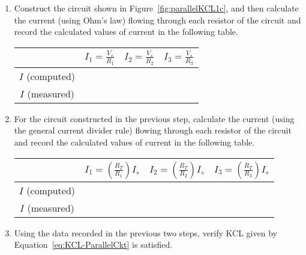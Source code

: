 \begin{enumerate}
   
 \item Construct the circuit shown in Figure~\ref{fig:parallelKCL1c}, and then calculate the current (using Ohm's law) flowing through each resistor of the circuit and record the calculated values of current in the following table. %

   \begin{center}
     \begin{tabular}{c|c|c|c}
       \toprule
       & $I_1=\frac{V_s}{R_1}$ & $I_2=\frac{V_s}{R_2}$ & $I_3=\frac{V_s}{R_3}$\\
       \toprule    
       $I$ (computed) & & & \\
       \hline
       $I$ (measured) & & & \\    
       \bottomrule
     \end{tabular}        
   \end{center}

  


 \item For the circuit constructed in the previous step, calculate the current (using the general current divider rule) flowing through each resistor of the circuit and record the calculated values of current in the following table.

   \begin{center}
     \begin{tabular}{c|c|c|c}
       \toprule
       & $I_1=\left(\frac{R_T}{R_1}\right)I_s$ & $I_2=\left(\frac{R_T}{R_2}\right)I_s$ & $I_3=\left(\frac{R_T}{R_3}\right)I_s$\\
       \toprule    
       $I$ (computed) & & & \\
       \hline
       $I$ (measured) & & & \\    
       \bottomrule
     \end{tabular}        
   \end{center}




  
\item Using the data recorded in the previous two steps, verify KCL given by Equation~\eqref{eq:KCL-ParallelCkt} is satisfied. 
\end{enumerate}



